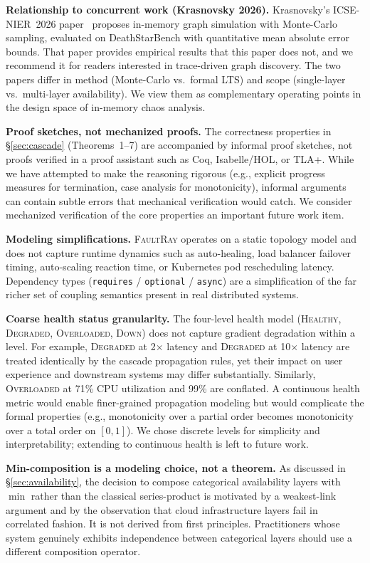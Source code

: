 \documentclass[10pt,twocolumn]{article}
\begin{document}
\textbf{Relationship to concurrent work (Krasnovsky 2026).}
Krasnovsky's ICSE-NIER~2026 paper~\cite{krasnovsky2026} proposes
in-memory graph simulation with Monte-Carlo sampling, evaluated on
DeathStarBench with quantitative mean absolute error bounds. That
paper provides empirical results that this paper does not, and we
recommend it for readers interested in trace-driven graph discovery.
The two papers differ in method (Monte-Carlo vs.\ formal LTS) and
scope (single-layer vs.\ multi-layer availability). We view them as
complementary operating points in the design space of in-memory
chaos analysis.

\textbf{Proof sketches, not mechanized proofs.}
The correctness properties in \S\ref{sec:cascade} (Theorems~1--7)
are accompanied by informal proof sketches, not proofs verified
in a proof assistant such as Coq, Isabelle/HOL, or TLA+. While
we have attempted to make the reasoning rigorous (e.g., explicit
progress measures for termination, case analysis for monotonicity),
informal arguments can contain subtle errors that mechanical
verification would catch. We consider mechanized verification of
the core properties an important future work item.

\textbf{Modeling simplifications.}
\textsc{FaultRay} operates on a static topology model and does not
capture runtime dynamics such as auto-healing, load balancer failover
timing, auto-scaling reaction time, or Kubernetes pod rescheduling
latency. Dependency types (\texttt{requires} / \texttt{optional} /
\texttt{async}) are a simplification of the far richer set of
coupling semantics present in real distributed systems.

\textbf{Coarse health status granularity.}
The four-level health model (\textsc{Healthy}, \textsc{Degraded},
\textsc{Overloaded}, \textsc{Down}) does not capture gradient
degradation within a level. For example, \textsc{Degraded} at
2$\times$ latency and \textsc{Degraded} at 10$\times$ latency are
treated identically by the cascade propagation rules, yet their
impact on user experience and downstream systems may differ
substantially. Similarly, \textsc{Overloaded} at 71\% CPU
utilization and 99\% are conflated. A continuous health metric
would enable finer-grained propagation modeling but would
complicate the formal properties (e.g., monotonicity over a
partial order becomes monotonicity over a total order on
$[0, 1]$). We chose discrete levels for simplicity and
interpretability; extending to continuous health is left to
future work.

\textbf{Min-composition is a modeling choice, not a theorem.}
As discussed in \S\ref{sec:availability}, the decision to compose
categorical availability layers with $\min$ rather than the classical
series-product is motivated by a weakest-link argument and by the
observation that cloud infrastructure layers fail in correlated
fashion. It is not derived from first principles. Practitioners whose
system genuinely exhibits independence between categorical layers
should use a different composition operator.
\end{document}
